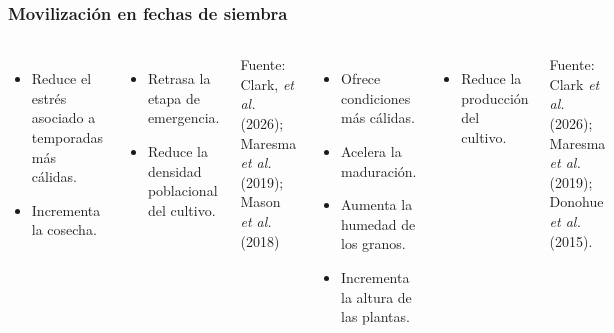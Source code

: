 \documentclass[aspectratio=169]{beamer}
\begin{document}
{\begin{frame}
\begin{columns}
		\end{columns}
		
	\end{frame}
	
	\begin{frame}
		\frametitle{Movilización en fechas de siembra}
		\vspace*{-1cm}\begin{columns}
			\begin{itemize}
				\item Reduce el estrés asociado a temporadas más cálidas.
				\item Incrementa la cosecha.
			\end{itemize}
			\begin{itemize}
				\item Retrasa la etapa de emergencia.
				\item Reduce la densidad poblacional del cultivo.
			\end{itemize}
			{\tiny Fuente: Clark, \textit{et al.} (2026); Maresma \textit{et al.} (2019); Mason \textit{et al.} (2018)}
			
			\begin{itemize}
				\item Ofrece condiciones más cálidas.
				\item Acelera la maduración.
				\item Aumenta la humedad de los granos.
				\item Incrementa la altura de las plantas.
			\end{itemize}
			\pause
			\begin{itemize}
				\item Reduce la producción del cultivo.
			\end{itemize}
			{\tiny Fuente: Clark \textit{et al.} (2026); Maresma \textit{et al.} (2019); Donohue \textit{et al.} (2015).}
		\end{columns}
		
	\end{frame}
	
}
\end{document}
